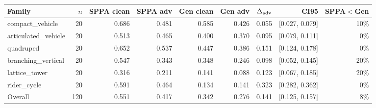 \begin{tabular}{@{}lrrrrrrrr@{}}
\toprule
Family & $n$ & SPPA clean & SPPA adv & Gen clean & Gen adv & $\Delta_{\rm adv}$ & CI95 & SPPA$<$Gen \\
\midrule
compact\_vehicle & 20 & 0.686 & 0.481 & 0.585 & 0.426 & 0.055 & [0.027, 0.079] & 10\% \\
articulated\_vehicle & 20 & 0.513 & 0.465 & 0.400 & 0.370 & 0.095 & [0.079, 0.111] & 0\% \\
quadruped & 20 & 0.652 & 0.537 & 0.447 & 0.386 & 0.151 & [0.124, 0.178] & 0\% \\
branching\_vertical & 20 & 0.547 & 0.343 & 0.348 & 0.246 & 0.098 & [0.052, 0.145] & 20\% \\
lattice\_tower & 20 & 0.316 & 0.211 & 0.141 & 0.088 & 0.123 & [0.067, 0.185] & 20\% \\
rider\_cycle & 20 & 0.591 & 0.464 & 0.134 & 0.141 & 0.323 & [0.282, 0.362] & 0\% \\
\midrule
Overall & 120 & 0.551 & 0.417 & 0.342 & 0.276 & 0.141 & [0.125, 0.157] & 8\% \\
\bottomrule
\end{tabular}

